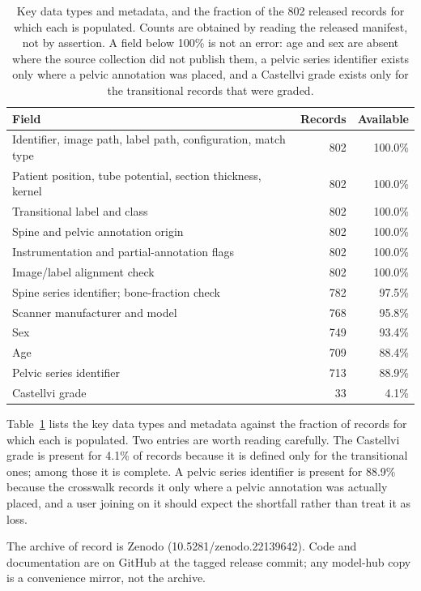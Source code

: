 \documentclass[aapm,mph,amsmath,amssymb,reprint,linenumbers]{revtex4-2}
\newcommand{\datasetdoi}{10.5281/zenodo.22139642}
\begin{document}
\begin{table}[t]
\caption{\label{tab:completeness}Key data types and metadata, and the fraction of the 802
released records for which each is populated. Counts are obtained by reading the released
manifest, not by assertion. A field below 100\% is not an error: age and sex are absent
where the source collection did not publish them, a pelvic series identifier exists only
where a pelvic annotation was placed, and a Castellvi grade exists only for the transitional
records that were graded.}
\begin{ruledtabular}
\begin{tabular}{lrr}
Field & Records & Available \\
\hline
Identifier, image path, label path, configuration, match type & 802 & 100.0\% \\
Patient position, tube potential, section thickness, kernel & 802 & 100.0\% \\
Transitional label and class & 802 & 100.0\% \\
Spine and pelvic annotation origin & 802 & 100.0\% \\
Instrumentation and partial-annotation flags & 802 & 100.0\% \\
Image/label alignment check & 802 & 100.0\% \\
Spine series identifier; bone-fraction check & 782 & 97.5\% \\
Scanner manufacturer and model & 768 & 95.8\% \\
Sex & 749 & 93.4\% \\
Age & 709 & 88.4\% \\
Pelvic series identifier & 713 & 88.9\% \\
Castellvi grade & 33 & 4.1\% \\
\end{tabular}
\end{ruledtabular}
\end{table}

Table~\ref{tab:completeness} lists the key data types and metadata against the fraction of
records for which each is populated. Two entries are worth reading carefully. The Castellvi
grade is present for 4.1\% of records because it is defined only for the transitional ones;
among those it is complete. A pelvic series identifier is present for 88.9\% because the
crosswalk records it only where a pelvic annotation was actually placed, and a user joining
on it should expect the shortfall rather than treat it as loss.

The archive of record is Zenodo (\datasetdoi). Code and documentation are on GitHub at
the tagged release commit; any model-hub copy is a convenience mirror, not the archive.
\end{document}
